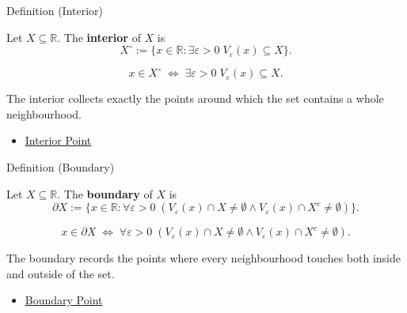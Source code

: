 \begin{definitionbox}{Definition (Interior)}
\begin{definition}[Interior]
\label{def:interior-r}
Let $X\subseteq\mathbb{R}$. The \textbf{interior} of $X$ is
\[
  X^\circ:=\{x\in\mathbb{R}:\exists\varepsilon>0\;V_\varepsilon(x)\subseteq X\}.
\]
\end{definition}
\end{definitionbox}

\begin{remark*}
\[
  x\in X^\circ\;\Longleftrightarrow\;\exists\varepsilon>0\;V_\varepsilon(x)\subseteq X.
\]
\end{remark*}

\begin{remark*}[Interpretation]
The interior collects exactly the points around which the set contains a
whole neighbourhood.
\end{remark*}

\begin{dependencies}
\begin{itemize}
  \item \hyperref[def:interior-point-r]{Interior Point}
\end{itemize}
\end{dependencies}

\begin{definitionbox}{Definition (Boundary)}
\begin{definition}[Boundary]
\label{def:boundary-r}
Let $X\subseteq\mathbb{R}$. The \textbf{boundary} of $X$ is
\[
  \partial X:=\{x\in\mathbb{R}:\forall\varepsilon>0\;(V_\varepsilon(x)\cap X\neq\emptyset\wedge V_\varepsilon(x)\cap X^c\neq\emptyset)\}.
\]
\end{definition}
\end{definitionbox}

\begin{remark*}
\[
  x\in\partial X\;\Longleftrightarrow\;
  \forall\varepsilon>0\;(V_\varepsilon(x)\cap X\neq\emptyset\wedge V_\varepsilon(x)\cap X^c\neq\emptyset).
\]
\end{remark*}

\begin{remark*}[Interpretation]
The boundary records the points where every neighbourhood touches both
inside and outside of the set.
\end{remark*}

\begin{dependencies}
\begin{itemize}
  \item \hyperref[def:boundary-point-r]{Boundary Point}
\end{itemize}
\end{dependencies}

